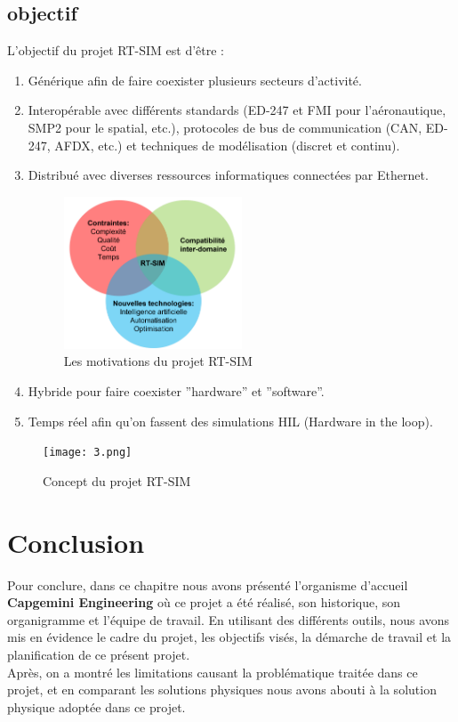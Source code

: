 \subsection{objectif}
L’objectif du projet RT-SIM est d’être :
\begin{enumerate}
  \item Générique afin de faire coexister plusieurs secteurs d’activité.
  \item Interopérable avec différents standards (ED-247 et FMI pour l’aéronautique,
  SMP2 pour le spatial, etc.), protocoles de bus de communication (CAN, ED-247,
  AFDX, etc.) et techniques de modélisation (discret et continu).
  \item Distribué avec diverses ressources informatiques connectées par Ethernet.
  \begin{figure}[hbt!]
    \centering
    \includegraphics[width=0.5\textwidth]{2.png}
    \caption{Les motivations du projet RT-SIM}
  \end{figure}
  \item Hybride pour faire coexister ”hardware” et ”software”.
  \item Temps réel afin qu'on fassent des simulations HIL (Hardware in the loop).
\end{enumerate}
\begin{figure}[hbt!]
  \centering
  \texttt{[image: 3.png]}
  \caption{Concept du projet RT-SIM}
\end{figure}
\section{Conclusion}

Pour conclure, dans ce chapitre nous avons présenté l’organisme d’accueil \textbf{ Capgemini Engineering} où ce projet a été réalisé, son historique, son organigramme et l’équipe de
travail. En utilisant des différents outils, nous avons mis en évidence le cadre du projet, les
objectifs visés, la démarche de travail et la planification de ce présent projet.
\\
Après, on a montré les limitations causant la problématique traitée dans ce projet, et en comparant les solutions physiques nous avons abouti à la solution physique adoptée dans ce projet.

